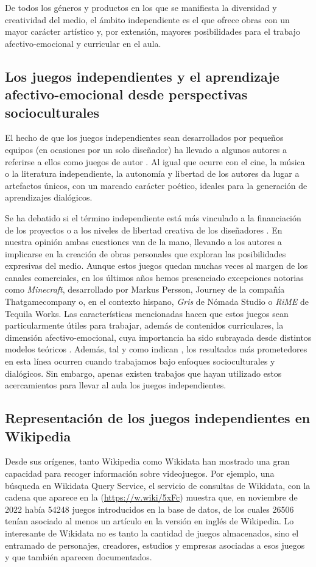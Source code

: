 \documentclass[spanish]{textolivre}
\begin{document}
De todos los géneros y productos en los que se manifiesta la diversidad y creatividad del medio, el ámbito independiente es el que ofrece obras con un mayor carácter artístico \cite{perez_latorre_indie_2016} y, por extensión, mayores posibilidades para el trabajo afectivo-emocional y curricular en el aula.


\subsection{Los juegos independientes y el aprendizaje afectivo-emocional desde perspectivas socioculturales}
El hecho de que los juegos independientes sean desarrollados por pequeños equipos (en ocasiones por un solo diseñador) ha llevado a algunos autores a referirse a ellos como juegos de autor \cite{backe_within_2017}. Al igual que ocurre con el cine, la música o la literatura independiente, la autonomía y libertad de los autores da lugar a artefactos únicos, con un marcado carácter poético, ideales para la generación de aprendizajes dialógicos.

Se ha debatido si el término independiente está más vinculado a la financiación de los proyectos o a los niveles de libertad creativa de los diseñadores \cite{perez_latorre_indie_2016}. En nuestra opinión ambas cuestiones van de la mano, llevando a los autores a implicarse en la creación de obras personales que exploran las posibilidades expresivas del medio. Aunque estos juegos quedan muchas veces al margen de los canales comerciales, en los últimos años hemos presenciado excepciones notorias como \emph{Minecraft}, desarrollado por Markus Persson, Journey de la compañía Thatgamecompany o, en el contexto hispano, \emph{Gris} de Nómada Studio o \emph{RiME} de Tequila Works. Las características mencionadas hacen que estos juegos sean particularmente útiles para trabajar, además de contenidos curriculares, la dimensión afectivo-emocional, cuya importancia ha sido subrayada desde distintos modelos teóricos \cite{bar2006bar, mayer_ability_2016}. Además, tal y como indican \textcite{plass_foundations_2015}, los resultados más prometedores en esta línea ocurren cuando trabajamos bajo enfoques socioculturales y dialógicos. Sin embargo, apenas existen trabajos que hayan utilizado estos acercamientos para llevar al aula los juegos independientes.


\subsection{Representación de los juegos independientes en Wikipedia}
Desde sus orígenes, tanto Wikipedia como Wikidata han mostrado una gran capacidad para recoger información sobre videojuegos. Por ejemplo, una búsqueda en Wikidata Query Service, el servicio de consultas de Wikidata, con la cadena que aparece en la  (\url{https://w.wiki/5xFc}) muestra que, en noviembre de 2022 había 54248 juegos introducidos en la base de datos, de los cuales 26506 tenían asociado al menos un artículo en la versión en inglés de Wikipedia. Lo interesante de Wikidata no es tanto la cantidad de juegos almacenados, sino el entramado de personajes, creadores, estudios y empresas asociadas a esos juegos y que también aparecen documentados.
\end{document}
